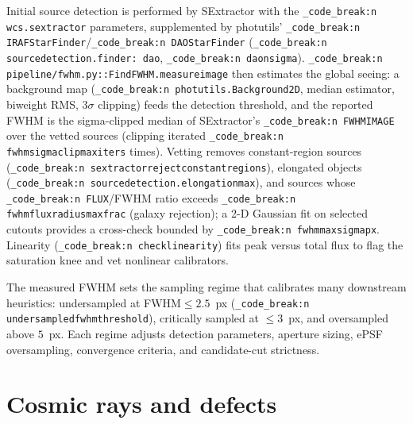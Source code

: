 \documentclass[11pt,a4paper]{article}
\renewcommand{\_}{\autophotunderscore\allowbreak}
\DeclareRobustCommand{\code}[1]{\texttt{\autophot_code_break:n {#1}}}
\begin{document}
Initial source detection is performed by SExtractor
\citep{bertin1996sextractor} with the \code{wcs.sextractor\_*} parameters,
supplemented by photutils' \code{IRAFStarFinder}\slash\code{DAOStarFinder}
(\code{source\_detection.finder: dao}, \code{dao\_nsigma}).
\code{pipeline/fwhm.py::Find\_FWHM.measure\_image} then estimates the
global seeing: a background map (\code{photutils.Background2D}, median
estimator, biweight RMS, 3$\sigma$ clipping) feeds the detection
threshold, and the reported FWHM is the sigma-clipped median of
SExtractor's \code{FWHM\_IMAGE} over the vetted sources (clipping iterated
\code{fwhm\_sigma\_clip\_maxiters} times). Vetting removes constant-region
sources (\code{sextractor\_reject\_constant\_regions}), elongated objects
(\code{source\_detection.elongation\_max}), and sources whose
\code{FLUX\_}/FWHM ratio exceeds \code{fwhm\_flux\_radius\_max\_frac}
(galaxy rejection); a 2-D Gaussian fit on selected cutouts provides a
cross-check bounded by \code{fwhm\_max\_sigma\_px}. Linearity
(\code{check\_linearity}) fits peak versus total flux to flag the
saturation knee and vet nonlinear calibrators.

The measured FWHM sets the sampling regime that calibrates many
downstream heuristics: undersampled at FWHM$\le 2.5$~px
(\code{undersampled\_fwhm\_threshold}), critically sampled at
$\le 3$~px, and oversampled above $5$~px. Each regime adjusts detection
parameters, aperture sizing, ePSF oversampling, convergence criteria, and
candidate-cut strictness.

\section{Cosmic rays and defects}
\label{sec:cosmic}
\end{document}
